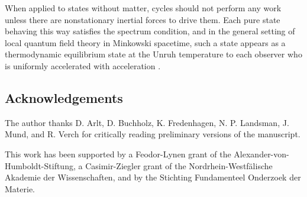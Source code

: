\documentclass[a4paper,11pt]{article}
\begin{document}
When applied to states without matter, cycles should
not perform any work unless there are nonstationary
inertial forces to drive them. Each pure state behaving
this way satisfies the spectrum condition, and in the general
setting of local quantum field theory in Minkowski spacetime,
such a state appears as a thermodynamic equilibrium state at the
Unruh temperature \coordHE{} to each
observer who is uniformly accelerated with acceleration \coordHE{}.


\subsection*{Acknowledgements}
The author thanks D. Arlt, D. Buchholz, K. Fredenhagen, N. P.
Landsman, J. Mund, and R. Verch for critically reading
preliminary versions of the manuscript.

This work has been supported by a Feodor-Lynen grant of the
Alexander-von-Humboldt-Stiftung, a Casimir-Ziegler grant of
the Nordrhein-Westf\"ali\-sche Akademie der Wissenschaften, and
by the Stichting Fundamenteel Onderzoek der Materie.
\end{document}
